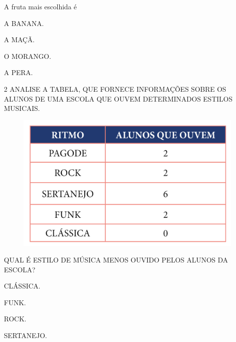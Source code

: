 A fruta mais escolhida é

\begin{minipage}{.5\textwidth}
\begin{escolha}
\item A BANANA.

\item A MAÇÃ.

\item O MORANGO.

\item A PERA.
\end{escolha}
\end{minipage}

\num{2} ANALISE A TABELA, QUE FORNECE INFORMAÇÕES SOBRE OS ALUNOS DE UMA ESCOLA QUE OUVEM DETERMINADOS ESTILOS MUSICAIS.

\begin{figure}[htpb!]
\centering
\includegraphics[width=.5\textwidth]{../ilustracoes/MAT1/SAEB_1ANO_MAT_FIGURA110.png}
\end{figure}

QUAL É ESTILO DE MÚSICA MENOS OUVIDO PELOS ALUNOS DA ESCOLA?

\begin{minipage}{.5\textwidth}
\begin{escolha}
\item CLÁSSICA.

\item FUNK.

\item ROCK.

\item SERTANEJO.
\end{escolha}
\end{minipage}


